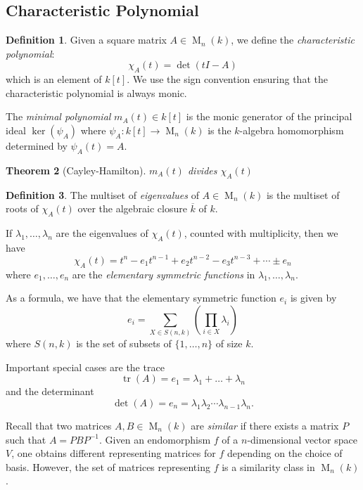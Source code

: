 \documentclass[12pt]{article}
\theoremstyle{plain}
\newtheorem{theorem}{Theorem}[section]
\theoremstyle{definition}
\newtheorem{definition}[theorem]{Definition}
\theoremstyle{remark}
\numberwithin{equation}{section}
\begin{document}
\subsection{Characteristic Polynomial}

\begin{definition}
Given a square matrix $A \in \operatorname{M}_n(k)$, we define the
\emph{characteristic polynomial}:
\[
\chi_A(t) = \det(tI-A)
\]
which is an element of $k[t]$.
We use the sign convention ensuring that the
characteristic polynomial is always monic.

The \emph{minimal polynomial} $m_A(t) \in k[t]$ is the monic generator
of the principal ideal $\ker(\psi_A)$ where
$\psi_A : k[t] \to \operatorname{M}_n(k)$ is the $k$-algebra
homomorphism determined by $\psi_A(t)=A$.
\end{definition}

\begin{theorem}[Cayley-Hamilton]
$m_A(t)$ divides $\chi_A(t)$
\end{theorem}

\begin{definition}
The multiset of \emph{eigenvalues} of $A \in \operatorname{M}_n(k)$ is
the multiset of roots of $\chi_A(t)$ over the algebraic closure
$\overline{k}$ of $k$.
\end{definition}

If $\lambda_1, \ldots, \lambda_n$ are the eigenvalues of $\chi_A(t)$,
counted with multiplicity,
then we have
\[
\chi_A(t) = t^n - e_1 t^{n-1} + e_2 t^{n-2} - e_3 t^{n-3} + \cdots \pm e_n
\]
where $e_1,\ldots, e_n$ are the \emph{elementary symmetric functions}
in $\lambda_1,\ldots, \lambda_n$.

As a formula, we have that the elementary symmetric function $e_i$
is given by
\[
e_i = \sum_{X \in S(n,k)} \left(\prod_{i \in X} \lambda_i\right)
\]
where $S(n,k)$ is the set of subsets of $\{1,\ldots,n\}$ of size
$k$.

Important special cases are the trace
\[
\operatorname{tr}(A) = e_1 = \lambda_1 + \ldots + \lambda_n
\]
and the determinant
\[
\det(A) = e_n = \lambda_1 \lambda_2 \cdots \lambda_{n-1} \lambda_n .
\]

Recall that two matrices $A,B \in \operatorname{M}_n(k)$ are \emph{similar}
if there exists a matrix $P$ such that $A=PBP^{-1}$.
Given an endomorphism $f$ of a $n$-dimensional vector space $V$,
one obtains different representing matrices for $f$ depending on the
choice of basis.  However, the set of matrices representing $f$ is
a similarity class in $\operatorname{M}_n(k)$.
\end{document}

